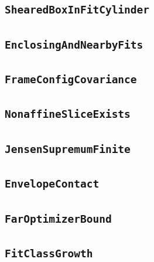 \documentclass[11pt]{amsart}
\theoremstyle{definition}
\begin{document}
\subsection{\texorpdfstring{\texttt{ShearedBoxInFitCylinder}}{ShearedBoxInFitCylinder}}\label{node:ShearedBoxInFitCylinder}


\subsection{\texorpdfstring{\texttt{EnclosingAndNearbyFits}}{EnclosingAndNearbyFits}}\label{node:EnclosingAndNearbyFits}


\subsection{\texorpdfstring{\texttt{FrameConfigCovariance}}{FrameConfigCovariance}}\label{node:FrameConfigCovariance}


\subsection{\texorpdfstring{\texttt{NonaffineSliceExists}}{NonaffineSliceExists}}\label{node:NonaffineSliceExists}


\subsection{\texorpdfstring{\texttt{JensenSupremumFinite}}{JensenSupremumFinite}}\label{node:JensenSupremumFinite}


\subsection{\texorpdfstring{\texttt{EnvelopeContact}}{EnvelopeContact}}\label{node:EnvelopeContact}


\subsection{\texorpdfstring{\texttt{FarOptimizerBound}}{FarOptimizerBound}}\label{node:FarOptimizerBound}


\subsection{\texorpdfstring{\texttt{FitClassGrowth}}{FitClassGrowth}}\label{node:FitClassGrowth}

\end{document}
